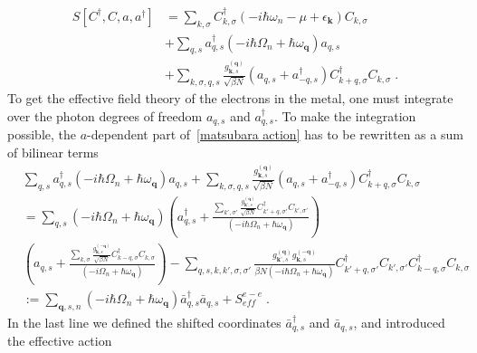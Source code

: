 \documentclass{article}
\begin{document}
\begin{align}
    S[C^{\dagger},C,a,a^{\dagger}] &= \sum_{k,\sigma} C^{\dagger}_{k,\sigma}\left(-i\hbar\omega_n - \mu + \epsilon_{\textbf{k}}\right) C_{k,\sigma} \nonumber \\
                                   &+ \sum_{q,s} a^{\dagger}_{q,s} \left(-i\hbar \Omega_n + \hbar \omega_{\textbf{q}}\right) a_{q,s} \label{matsubara action} \\
                                   &+ \sum_{k,\sigma,q,s} \frac{g_{\textbf{k},s}^{(\textbf{q})}}{\sqrt{\beta N}} \left(a_{q,s} + a_{-q, s}^{\dagger}\right) C^{\dagger}_{k + q,\sigma}C_{k,\sigma}\;.\nonumber
\end{align}
To get the effective field theory of the electrons in the metal, one must integrate over the photon degrees of freedom $a_{q,s}$ and $a_{q,s}^{\dagger}$. To make the integration possible, the $a$-dependent part of~\cref{matsubara action} has to be rewritten as a sum of bilinear terms
\begin{align}
     &\sum_{q,s} a^{\dagger}_{q,s} \left(-i\hbar\Omega_n + \hbar \omega_{\textbf{q}}\right) a_{q,s} + \sum_{k,\sigma,q,s} \frac{g_{\textbf{k},s}^{(\textbf{q})}}{\sqrt{\beta N}} \left(a_{q,s} + a_{-q, s}^{\dagger}\right) C^{\dagger}_{k + q,\sigma}C_{k,\sigma}\nonumber \\
     &= \sum_{q,s} \left(-i\hbar\Omega_n + \hbar \omega_{\textbf{q}}\right)  \left(a^{\dagger}_{q,s} + \frac{\sum_{k',\sigma'} \frac{g_{\textbf{k'},s}^{(\textbf{q})}}{\sqrt{\beta N}} C^{\dagger}_{k' + q,\sigma'}C_{k',\sigma'} }{\left(-i\hbar\Omega_n + \hbar \omega_{\textbf{q}}\right)} \right) \label{rewriting action}\\
     & \left(a_{q,s} + \frac{\sum_{k,\sigma} \frac{g_{\textbf{k},s}^{(-\textbf{q})}}{\sqrt{\beta N}} C^{\dagger}_{k - q,\sigma}C_{k,\sigma} }{\left(-i\Omega_{n} + \hbar \omega_{\textbf{q}}\right)}\right)
     -\sum_{q,s,k,k',\sigma,\sigma'} \frac{g_{\textbf{k'},s}^{(\textbf{q})} g_{\textbf{k},s}^{(-\textbf{q})}  }{\beta N\left(-i\hbar\Omega_n + \hbar \omega_{\textbf{q}}\right)}
      C^{\dagger}_{k' + q,\sigma'}C_{k',\sigma'} C^{\dagger}_{k - q,\sigma}C_{k,\sigma}\nonumber \\
     &:= \sum_{\textbf{q},s,n} \left(-i\hbar\Omega_n + \hbar \omega_{\textbf{q}}\right)  \bar{a}^{\dagger}_{q,s}\bar{a}_{q,s} + S^{e-e}_{eff}\;.\nonumber
\end{align}
In the last line we defined the shifted coordinates  $\bar{a}^{\dagger}_{q,s}$ and $\bar{a}_{q,s}$, and introduced the effective action
\end{document}
